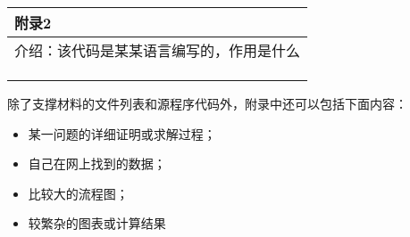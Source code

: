 \documentclass{article}
\begin{document}
\begin{table}[htbp]
    \centering
    \begin{tabular}{|p{14.0cm}|}
    \hline
    \textbf{附录2} \\ %
    \hline
    介绍：该代码是某某语言编写的，作用是什么   \\ 
    \\
    \\
    \\
    \hline
    \end{tabular}
\end{table}

除了支撑材料的文件列表和源程序代码外，附录中还可以包括下面内容：
\begin{itemize}
\item 某一问题的详细证明或求解过程；
\item 自己在网上找到的数据；
\item 比较大的流程图；
\item 较繁杂的图表或计算结果
\end{itemize}
\end{document}
